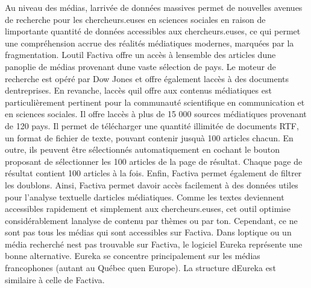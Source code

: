 \documentclass[
  letterpaper,
  DIV=11,
  numbers=noendperiod]{scrreprt}
\begin{document}
Au niveau des médias, l\textquotesingle arrivée de données massives
permet de nouvelles avenues de recherche pour les chercheurs.euses en
sciences sociales en raison de l\textquotesingle importante quantité de
données accessibles aux chercheurs.euses, ce qui permet une
compréhension accrue des réalités médiatiques modernes, marquées par la
fragmentation. L\textquotesingle outil Factiva offre un accès à
l\textquotesingle ensemble des articles d\textquotesingle une panoplie
de médias provenant d\textquotesingle une vaste sélection de pays. Le
moteur de recherche est opéré par Dow Jones et offre également
l\textquotesingle accès à des documents d\textquotesingle entreprises.
En revanche, l\textquotesingle accès qu\textquotesingle il offre aux
contenus médiatiques est particulièrement pertinent pour la communauté
scientifique en communication et en sciences sociales. Il offre
l\textquotesingle accès à plus de 15 000 sources médiatiques provenant
de 120 pays. Il permet de télécharger une quantité illimitée de
documents RTF, un format de fichier de texte, pouvant contenir
jusqu\textquotesingle à 100 articles chacun. En outre, ils peuvent être
sélectionnés automatiquement en cochant le bouton proposant de
sélectionner les 100 articles de la page de résultat. Chaque page de
résultat contient 100 articles à la fois. Enfin, Factiva permet
également de filtrer les doublons. Ainsi, Factiva permet
d\textquotesingle avoir accès facilement à des données utiles pour
l'analyse textuelle d\textquotesingle articles médiatiques. Comme les
textes deviennent accessibles rapidement et simplement aux
chercheurs.euses, cet outil optimise considérablement
l\textquotesingle analyse de contenu par thèmes ou par ton. Cependant,
ce ne sont pas tous les médias qui sont accessibles sur Factiva. Dans
l\textquotesingle optique ou un média recherché n\textquotesingle est
pas trouvable sur Factiva, le logiciel Eureka représente une bonne
alternative. Eureka se concentre principalement sur les médias
francophones (autant au Québec qu\textquotesingle en Europe). La
structure d\textquotesingle Eureka est similaire à celle de Factiva.~

\section{}\label{section}
\end{document}
